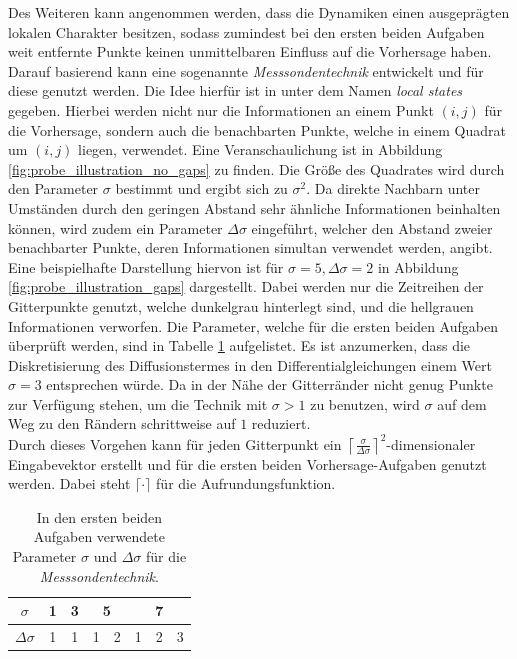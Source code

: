 Des Weiteren kann angenommen werden, dass die Dynamiken einen ausgeprägten lokalen Charakter besitzen, sodass zumindest bei den ersten beiden Aufgaben weit entfernte Punkte keinen unmittelbaren Einfluss auf die Vorhersage haben. Darauf basierend kann eine sogenannte \textit{Messsondentechnik} entwickelt und für diese genutzt werden. Die Idee hierfür ist in \citep{parlitz2000prediction} unter dem Namen \textit{local states} gegeben. Hierbei werden nicht nur die Informationen an einem Punkt $(i, j)$ für die Vorhersage, sondern auch die benachbarten Punkte, welche in einem Quadrat um $(i, j)$ liegen, verwendet. Eine Veranschaulichung ist in Abbildung \ref{fig:probe_illustration_no_gaps} zu finden. Die Größe des Quadrates wird durch den Parameter $\sigma$ bestimmt und ergibt sich zu $\sigma^2$. Da direkte Nachbarn unter Umständen durch den geringen Abstand sehr ähnliche Informationen beinhalten können, wird zudem ein Parameter $\Delta \sigma$ eingeführt, welcher den Abstand zweier benachbarter Punkte, deren Informationen simultan verwendet werden, angibt. Eine beispielhafte Darstellung hiervon ist für $\sigma = 5, \Delta \sigma=2$ in Abbildung \ref{fig:probe_illustration_gaps} dargestellt. Dabei werden nur die Zeitreihen der Gitterpunkte genutzt, welche dunkelgrau hinterlegt sind, und die hellgrauen Informationen verworfen. Die Parameter, welche für die ersten beiden Aufgaben überprüft werden, sind in Tabelle \ref{tab:probe_sigma_values} aufgelistet. Es ist anzumerken, dass die Diskretisierung des Diffusionstermes in den Differentialgleichungen einem Wert $\sigma=3$ entsprechen würde. Da in der Nähe der Gitterränder nicht genug Punkte zur Verfügung stehen, um die Technik mit $\sigma>1$ zu benutzen, wird $\sigma$ auf dem Weg zu den Rändern schrittweise auf $1$ reduziert.\\
Durch dieses Vorgehen kann für jeden Gitterpunkt ein ${\left \lceil{\frac{\sigma}{\Delta \sigma}}\right \rceil}^2$-dimensionaler Eingabevektor erstellt und für die ersten beiden Vorhersage-Aufgaben genutzt werden. Dabei steht $\lceil \cdot \rceil$ für die Aufrundungsfunktion.\\

\begin{table}[h]
\centering
\begin{tabular}{cc|c|c|c|c|c|c}
\hline
$\sigma$ & 1 & 3 & \multicolumn{2}{c|}{5} & \multicolumn{3}{c}{7} \\
\hline
$\Delta \sigma$ & 1 & 1 & 1 & 2 & 1 & 2 & 3 \\
\hline
\end{tabular} 
\caption{In den ersten beiden Aufgaben verwendete Parameter $\sigma$ und $\Delta \sigma$ für die \textit{Messsondentechnik}.}
\label{tab:probe_sigma_values}
\end{table} 

